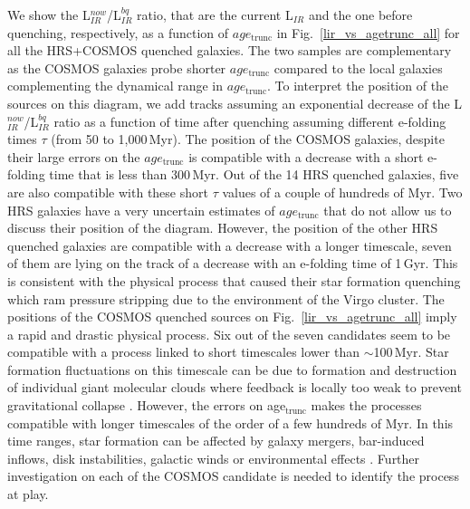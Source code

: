 \documentclass[traditabstract]{aa} %
\begin{document}
We show the L$_{IR}^{now}$/L$_{IR}^{bq}$ ratio, that are the current L$_{IR}$ and the one before quenching, respectively, as a function of $age_{\mathrm{trunc}}$ in Fig.~\ref{lir_vs_agetrunc_all} for all the HRS+COSMOS quenched galaxies.
The two samples are complementary as the COSMOS galaxies probe shorter $age_{\mathrm{trunc}}$ compared to the local galaxies complementing the dynamical range in $age_{\mathrm{trunc}}$.
To interpret the position of the sources on this diagram, we add tracks assuming an exponential decrease of the L$_{IR}^{now}$/L$_{IR}^{bq}$ ratio as a function of time after quenching assuming different e-folding times $\tau$ (from 50 to 1,000\,Myr).
The position of the COSMOS galaxies, despite their large errors on the $age_{\mathrm{trunc}}$ is compatible with a decrease with a short e-folding time that is less than 300\,Myr.
Out of the 14 HRS quenched galaxies, five are also compatible with these short $\tau$ values of a couple of hundreds of Myr.
Two HRS galaxies have a very uncertain estimates of $age_{\mathrm{trunc}}$ that do not allow us to discuss their position of the diagram.
However, the position of the other HRS quenched galaxies are compatible with a decrease with a longer timescale, seven of them are lying on the track of a decrease with an e-folding time of 1\,Gyr. 
This is consistent with the physical process that caused their star formation quenching which ram pressure stripping due to the environment of the Virgo cluster.
The positions of the COSMOS quenched sources on Fig.~\ref{lir_vs_agetrunc_all} imply a rapid and drastic physical process.
Six out of the seven candidates seem to be compatible with a process linked to short timescales lower than $\sim$100\,Myr.
Star formation fluctuations on this timescale can be due to formation and destruction of individual giant molecular clouds where feedback is locally too weak to prevent gravitational collapse \citep[e.g.][, and references therein]{ScaloStruckMarcell84,FaucherGiguere18,Orr19,Tacchella20}.
However, the errors on age$_{\mathrm{trunc}}$ makes the processes compatible with longer timescales of the order of a few hundreds of Myr.
In this time ranges, star formation can be affected by galaxy mergers, bar-induced inflows, disk instabilities, galactic winds or environmental effects \citep{GunnGott72,Hernquist89,MihosHernquist96,Robertson06,OppenheimerDave08,McQuinn10,DekelBurkert14,Zolotov15,Tacchella16,Sparre17,Torrey18,WangLilly19,Tacchella20}.
Further investigation on each of the COSMOS candidate is needed to identify the process at play.
\end{document}
